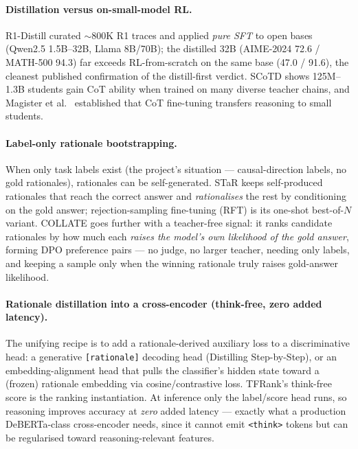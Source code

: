 \paragraph{Distillation versus on-small-model RL.} R1-Distill
\citep{rl:deepseekr1} curated ${\sim}800$K R1 traces and applied \emph{pure SFT}
to open bases (Qwen2.5 1.5B--32B, Llama 8B/70B); the distilled 32B (AIME-2024
72.6 / MATH-500 94.3) far exceeds RL-from-scratch on the same base (47.0 / 91.6),
the cleanest published confirmation of the distill-first verdict. SCoTD
\citep{rl:li2023scotd} shows 125M--1.3B students gain CoT ability when trained on
many diverse teacher chains, and Magister et al.\ \citep{rl:magister2022teaching}
established that CoT fine-tuning transfers reasoning to small students.

\paragraph{Label-only rationale bootstrapping.} When only task labels exist (the
project's situation --- causal-direction labels, no gold rationales), rationales
can be self-generated. STaR \citep{rl:zelikman2022star} keeps self-produced
rationales that reach the correct answer and \emph{rationalises} the rest by
conditioning on the gold answer; rejection-sampling fine-tuning (RFT)
\citep{rl:yuan2023rft} is its one-shot best-of-$N$ variant. COLLATE
\citep{rl:patnaik2025collate} goes further with a teacher-free signal: it ranks
candidate rationales by how much each \emph{raises the model's own likelihood of
the gold answer}, forming DPO preference pairs --- no judge, no larger teacher,
needing only labels, and keeping a sample only when the winning rationale truly
raises gold-answer likelihood.

\paragraph{Rationale distillation into a cross-encoder (think-free, zero added
latency).} The unifying recipe is to add a rationale-derived auxiliary loss to a
discriminative head: a generative \texttt{[rationale]} decoding head (Distilling
Step-by-Step), or an embedding-alignment head that pulls the classifier's hidden
state toward a (frozen) rationale embedding via cosine/contrastive loss. TFRank's
think-free score \citep{rl:tfrank2025} is the ranking instantiation. At inference
only the label/score head runs, so reasoning improves accuracy at \emph{zero}
added latency --- exactly what a production DeBERTa-class cross-encoder needs,
since it cannot emit \texttt{<think>} tokens but can be regularised toward
reasoning-relevant features.

